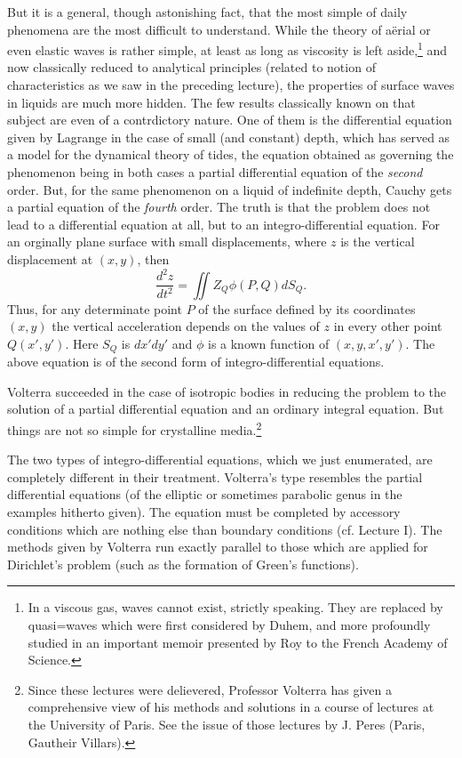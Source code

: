 \documentclass[12pt,oneside]{book}
\newcommand{\iit}[1]{\textit{#1}}
\begin{document}
But it is a general, though astonishing fact, that the most simple of daily phenomena are the most difficult to understand. While the theory of a\"erial or even elastic waves is rather simple, at least as long as viscosity is left aside,\footnote{In a viscous gas, waves cannot exist, strictly speaking. They are replaced by quasi=waves which were first considered by Duhem, and more profoundly studied in an important memoir presented by Roy to the French Academy of Science.} and now classically reduced to analytical principles (related to notion of characteristics as we saw in the preceding lecture), the properties of surface waves in liquids are much more hidden. The few results classically known on that subject are even of a contrdictory nature. One of them is the differential equation given by Lagrange in the case of small (and constant) depth, which has served as a model for the dynamical theory of tides, the equation obtained as governing the phenomenon being in both cases a partial differential equation of the \iit{second} order. But, for the same phenomenon on a liquid of indefinite depth, Cauchy gets a partial equation of the \iit{fourth} order. The truth is that the problem does not lead to a differential equation at all, but to an integro-differential equation. For an orginally plane surface with small displacements, where $z$ is the vertical displacement at $(x,y)$, then 
\begin{equation*}
    \frac{d^2z}{dt^2}=\iint Z_Q\phi(P,Q)dS_Q.
\end{equation*}
Thus, for any determinate point $P$ of the surface defined by its coordinates $(x,y)$ the vertical acceleration depends on the values of $z$ in every other point $Q(x',y')$. Here $S_Q$ is $dx'dy'$ and $\phi$ is a known function of $(x,y,x',y')$. The above equation is of the second form of integro-differential equations. \par 

Volterra succeeded in the case of isotropic bodies in reducing the problem to the solution of a partial differential equation and an ordinary integral equation. But things are not so simple for crystalline media.\footnote{Since these lectures were delievered, Professor Volterra has given a comprehensive view of his methods and solutions in a course of lectures at the University of Paris. See the issue of those lectures by J. Peres (Paris, Gautheir Villars).} \par 

The two types of integro-differential equations, which we just enumerated, are completely different in their treatment. Volterra's type resembles the partial differential equations (of the elliptic or sometimes parabolic genus in the examples hitherto given). The equation must be completed by accessory conditions which are nothing else than boundary conditions (cf. Lecture I). The methods given by Volterra run exactly parallel to those which are applied for Dirichlet's problem (such as the formation of Green's functions). \par 
\end{document}
